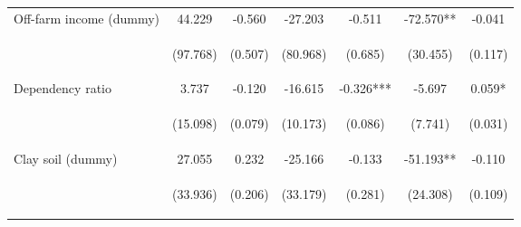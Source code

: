 \begin{center}
\begin{tabular}{lcccccc}
Off-farm income (dummy) & 44.229 & -0.560 & -27.203 & -0.511 & -72.570** & -0.041 \\
\vspace{4pt} & \begin{footnotesize}(97.768)\end{footnotesize} & \begin{footnotesize}(0.507)\end{footnotesize} & \begin{footnotesize}(80.968)\end{footnotesize} & \begin{footnotesize}(0.685)\end{footnotesize} & \begin{footnotesize}(30.455)\end{footnotesize} & \begin{footnotesize}(0.117)\end{footnotesize} \\
Dependency ratio & 3.737 & -0.120 & -16.615 & -0.326*** & -5.697 & 0.059* \\
\vspace{4pt} & \begin{footnotesize}(15.098)\end{footnotesize} & \begin{footnotesize}(0.079)\end{footnotesize} & \begin{footnotesize}(10.173)\end{footnotesize} & \begin{footnotesize}(0.086)\end{footnotesize} & \begin{footnotesize}(7.741)\end{footnotesize} & \begin{footnotesize}(0.031)\end{footnotesize} \\
Clay soil (dummy) & 27.055 & 0.232 & -25.166 & -0.133 & -51.193** & -0.110 \\
\vspace{4pt} & \begin{footnotesize}(33.936)\end{footnotesize} & \begin{footnotesize}(0.206)\end{footnotesize} & \begin{footnotesize}(33.179)\end{footnotesize} & \begin{footnotesize}(0.281)\end{footnotesize} & \begin{footnotesize}(24.308)\end{footnotesize} & \begin{footnotesize}(0.109)\end{footnotesize} \\

\end{tabular}
\end{center}
